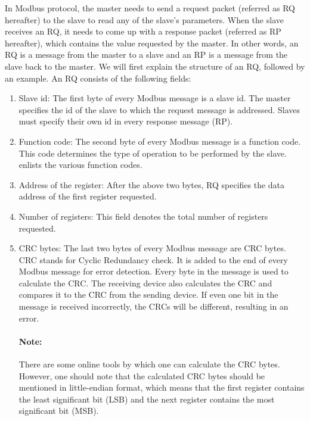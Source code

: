 

In Modbus protocol, the master needs to send a request packet (referred as RQ hereafter)
to the slave to read any of the slave's parameters. When the
slave receives an RQ, it needs to come up with a response packet
(referred as RP hereafter), which contains the value requested
by the master. In other words, an RQ is a message from the
master to a slave and an RP is a message from the slave back to the
master. We will first explain the structure of an RQ, followed by an example.
An RQ consists of the following fields:
\begin{enumerate}
  \item Slave id: The first byte of every Modbus message is a slave id.
        The master specifies the id of the slave to which the request message
        is addressed. Slaves must specify their own id in every
        response message (RP).
  \item Function code: The second byte of every Modbus message is a
        function code. This code determines the type of operation to be
        performed by the slave.  enlists the various
        function codes.
  \item Address of the register: After the above two bytes, RQ specifies the
        data address of the first register requested.
  \item Number of registers: This field denotes the total number of
        registers requested.
  \item CRC bytes: The last two bytes of every Modbus message are CRC
        bytes. CRC stands for Cyclic Redundancy check.  It is added to the
        end of every Modbus message for error detection.
        Every byte in the message is used to calculate the CRC.
        The receiving device also calculates the CRC and compares it to the
        CRC from the sending device. If even one bit in the message is
        received incorrectly, the CRCs will be different, resulting in an error.

        \paragraph{Note:} There are some online tools \cite{online-crc} by which one can calculate
        the CRC bytes. However, one should note that the calculated CRC bytes
        should be mentioned in little-endian format, which means that
        the first register contains the least significant bit (LSB) and the
        next register contains the most significant bit (MSB).
\end{enumerate}

